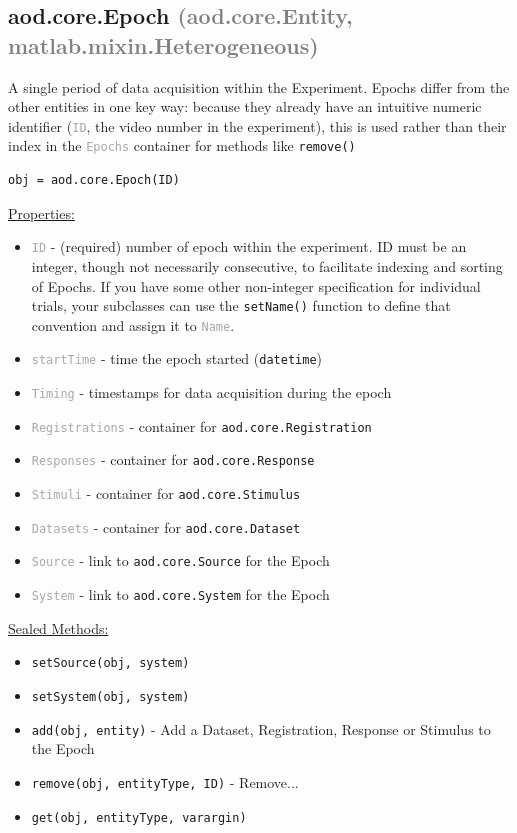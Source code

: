 \documentclass[10pt]{exam}
\newcommand\myparent[1]{\textcolor{gray}{(#1)}}
\newcommand\aodclass[1]{\textcolor{codeblue}{\texttt{#1}}}
\newcommand\aodprop[1]{\textcolor{darkgray}{\texttt{#1}}}
\newcommand\aodfcn[1]{\textcolor{darkteal}{\texttt{#1}}}
\newcommand\docheader[1]{\vspace{0.6ex}\noindent\underline{#1}\vspace{0.15ex}}
\begin{document}
	\subsection{aod.core.Epoch \myparent{aod.core.Entity, matlab.mixin.Heterogeneous}}
		\noindent A single period of data acquisition within the Experiment. Epochs differ from the other entities in one key way: because they already have an intuitive numeric identifier (\aodprop{ID}, the video number in the experiment), this is used rather than their index in the \aodprop{Epochs} container for methods like \aodfcn{remove()} 
	
		\begin{lstlisting}[style=matlab-editor, basicstyle=\mlttfamily\footnotesize]
obj = aod.core.Epoch(ID)
		\end{lstlisting}
		\docheader{Properties:}
		\begin{itemize}
			\item \aodprop{ID} - (required) number of epoch within the experiment. ID must be an integer, though not necessarily consecutive, to facilitate indexing and sorting of Epochs. If you have some other non-integer specification for individual trials, your subclasses can use the \aodfcn{setName()} function to define that convention and assign it to \aodprop{Name}. 
			\item \aodprop{startTime} - time the epoch started (\aodclass{datetime})\\
			\item \aodprop{Timing} - timestamps for data acquisition during the epoch
			\item \aodprop{Registrations} - container for \aodclass{aod.core.Registration}
			\item \aodprop{Responses} - container for \aodclass{aod.core.Response}
			\item \aodprop{Stimuli} - container for \aodclass{aod.core.Stimulus}
			\item \aodprop{Datasets} - container for \aodclass{aod.core.Dataset}
			\item \aodprop{Source} - link to \aodclass{aod.core.Source} for the Epoch
			\item \aodprop{System} - link to \aodclass{aod.core.System} for the Epoch
		\end{itemize}	
		\docheader{Sealed Methods:}
		\begin{itemize}
			\item \aodfcn{setSource(obj, system)}
			\item \aodfcn{setSystem(obj, system)}\\
			\item \aodfcn{add(obj, entity)} - Add a Dataset, Registration, Response or Stimulus to the Epoch
			\item \aodfcn{remove(obj, entityType, ID)} - Remove...
			\item \aodfcn{get(obj, entityType, varargin)}
		\end{itemize}	
\end{document}
